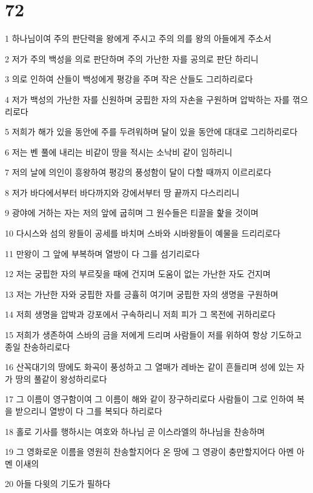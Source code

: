 \chapter{72}

\par 1 하나님이여 주의 판단력을 왕에게 주시고 주의 의를 왕의 아들에게 주소서
\par 2 저가 주의 백성을 의로 판단하며 주의 가난한 자를 공의로 판단 하리니
\par 3 의로 인하여 산들이 백성에게 평강을 주며 작은 산들도 그리하리로다
\par 4 저가 백성의 가난한 자를 신원하며 궁핍한 자의 자손을 구원하며 압박하는 자를 꺾으리로다
\par 5 저희가 해가 있을 동안에 주를 두려워하며 달이 있을 동안에 대대로 그리하리로다
\par 6 저는 벤 풀에 내리는 비같이 땅을 적시는 소낙비 같이 임하리니
\par 7 저의 날에 의인이 흥왕하여 평강의 풍성함이 달이 다할 때까지 이르리로다
\par 8 저가 바다에서부터 바다까지와 강에서부터 땅 끝까지 다스리리니
\par 9 광야에 거하는 자는 저의 앞에 굽히며 그 원수들은 티끌을 핥을 것이며
\par 10 다시스와 섬의 왕들이 공세를 바치며 스바와 시바왕들이 예물을 드리리로다
\par 11 만왕이 그 앞에 부복하며 열방이 다 그를 섬기리로다
\par 12 저는 궁핍한 자의 부르짖을 때에 건지며 도움이 없는 가난한 자도 건지며
\par 13 저는 가난한 자와 궁핍한 자를 긍휼히 여기며 궁핍한 자의 생명을 구원하며
\par 14 저희 생명을 압박과 강포에서 구속하리니 저희 피가 그 목전에 귀하리로다
\par 15 저희가 생존하여 스바의 금을 저에게 드리며 사람들이 저를 위하여 항상 기도하고 종일 찬송하리로다
\par 16 산꼭대기의 땅에도 화곡이 풍성하고 그 열매가 레바논 같이 흔들리며 성에 있는 자가 땅의 풀같이 왕성하리로다
\par 17 그 이름이 영구함이여 그 이름이 해와 같이 장구하리로다 사람들이 그로 인하여 복을 받으리니 열방이 다 그를 복되다 하리로다
\par 18 홀로 기사를 행하시는 여호와 하나님 곧 이스라엘의 하나님을 찬송하며
\par 19 그 영화로운 이름을 영원히 찬송할지어다 온 땅에 그 영광이 충만할지어다 아멘 아멘 이새의
\par 20 아들 다윗의 기도가 필하다

